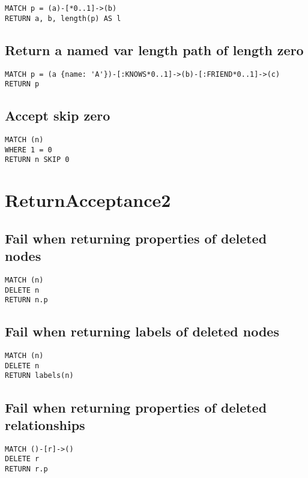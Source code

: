 \begin{lstlisting}
MATCH p = (a)-[*0..1]->(b)
RETURN a, b, length(p) AS l
\end{lstlisting}

\subsection{Return a named var length path of length zero}

\begin{lstlisting}
MATCH p = (a {name: 'A'})-[:KNOWS*0..1]->(b)-[:FRIEND*0..1]->(c)
RETURN p
\end{lstlisting}

\subsection{Accept skip zero}

\begin{lstlisting}
MATCH (n)
WHERE 1 = 0
RETURN n SKIP 0
\end{lstlisting}
\section{ReturnAcceptance2}


\subsection{Fail when returning properties of deleted nodes}

\begin{lstlisting}
MATCH (n)
DELETE n
RETURN n.p
\end{lstlisting}

\subsection{Fail when returning labels of deleted nodes}

\begin{lstlisting}
MATCH (n)
DELETE n
RETURN labels(n)
\end{lstlisting}

\subsection{Fail when returning properties of deleted relationships}

\begin{lstlisting}
MATCH ()-[r]->()
DELETE r
RETURN r.p
\end{lstlisting}


